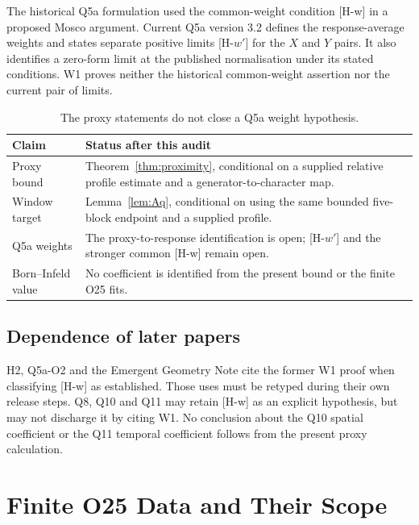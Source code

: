\documentclass[12pt]{article}
\theoremstyle{definition}
\theoremstyle{remark}
\begin{document}
  The historical Q5a formulation used the common-weight condition
  [H-w] in a proposed Mosco argument.
  Current Q5a version 3.2 defines the response-average weights and
  states separate positive limits [H-$w'$] for the $X$ and $Y$ pairs.
  It also identifies a zero-form limit at the published normalisation
  under its stated conditions.
  W1 proves neither the historical common-weight assertion nor the
  current pair of limits.

  \begin{table}[ht]
    \centering
    \begin{tabular}{p{}p{}}
      \hline
      Claim & Status after this audit \\
      \hline
      Proxy bound & Theorem~\ref{thm:proximity}, conditional on a supplied
        relative profile estimate and a generator-to-character map. \\
      Window target & Lemma~\ref{lem:Aq}, conditional on using the same
        bounded five-block endpoint and a supplied profile. \\
      Q5a weights & The proxy-to-response identification is open;
        [H-$w'$] and the stronger common [H-w] remain open. \\
      Born--Infeld value & No coefficient is identified from the present
        bound or the finite O25 fits. \\
      \hline
    \end{tabular}
    \caption{The proxy statements do not close a Q5a weight hypothesis.}
    \label{tab:status}
  \end{table}

  \subsection{Dependence of later papers}

  H2, Q5a-O2 and the Emergent Geometry Note cite the former W1 proof
  when classifying [H-w] as established.
  Those uses must be retyped during their own release steps.
  Q8, Q10 and Q11 may retain [H-w] as an explicit hypothesis, but may
  not discharge it by citing W1.
  No conclusion about the Q10 spatial coefficient or the Q11 temporal
  coefficient follows from the present proxy calculation.

  \section{Finite O25 Data and Their Scope}
\end{document}

